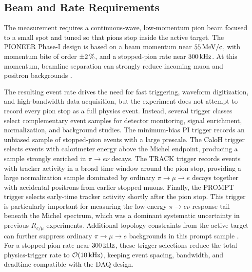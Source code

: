 \subsection{Beam and Rate Requirements}
\label{subsec:measurement-beam-rate}

The measurement requires a continuous-wave, low-momentum pion beam focused to
a small spot and tuned so that pions stop inside the active target. The
PIONEER Phase-I design is based on a beam momentum near
\(\SI{55}{\mega\electronvolt\per c}\), with momentum bite of order
\(\pm\SI{2}{\percent}\), and a stopped-pion rate near
\(\SI{300}{\kilo\hertz}\). At this momentum, beamline separation can
strongly reduce incoming muon and positron backgrounds
\cite{pioneer_proposal_2022}.

The resulting event rate drives the need for fast triggering, waveform
digitization, and high-bandwidth data acquisition, but the experiment does not
attempt to record every pion stop as a full physics event. Instead, several
trigger classes select complementary event samples for detector monitoring,
signal enrichment, normalization, and background studies. The minimum-bias PI
trigger records an unbiased sample of stopped-pion events with a large
prescale. The CaloH trigger selects events with calorimeter energy above the
Michel endpoint, producing a sample strongly enriched in
\(\pi\to e\nu\) decays. The TRACK trigger records events with tracker activity
in a broad time window around the pion stop, providing a large normalization
sample dominated by ordinary \(\pi\to\mu\to e\) decays together with accidental
positrons from earlier stopped muons. Finally, the PROMPT trigger selects
early-time tracker activity shortly after the pion stop. This trigger is
particularly important for measuring the low-energy
\(\pi\to e\nu\) response tail beneath the Michel spectrum, which was a dominant
systematic uncertainty in previous \(R_{e/\mu}\) experiments. Additional
topology constraints from the active target can further suppress ordinary
\(\pi\to\mu\to e\) backgrounds in this prompt sample
\cite{kammel_pioneer_trigger,pioneer_proposal_2022}. For a stopped-pion rate near \(\SI{300}{\kilo\hertz}\), these trigger
selections reduce the total physics-trigger rate to
\(\mathcal{O}\!\left(\SI{10}{\kilo\hertz}\right)\), keeping event spacing, bandwidth, and
deadtime compatible with the DAQ design.

